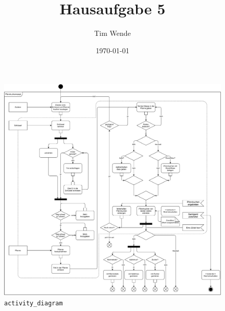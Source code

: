 \documentclass{article}
\author{Tim Wende}
\date{\today}
\title{\textbf{Hausaufgabe 5}}
\begin{document}
    \maketitle

    \begin{figure}[ht]
        \includegraphics[width=\textwidth]{swt_wende_tim_h05_activity_diagram.pdf}
        \caption{\texttt{activity\_diagram}}
    \end{figure}
\end{document}
